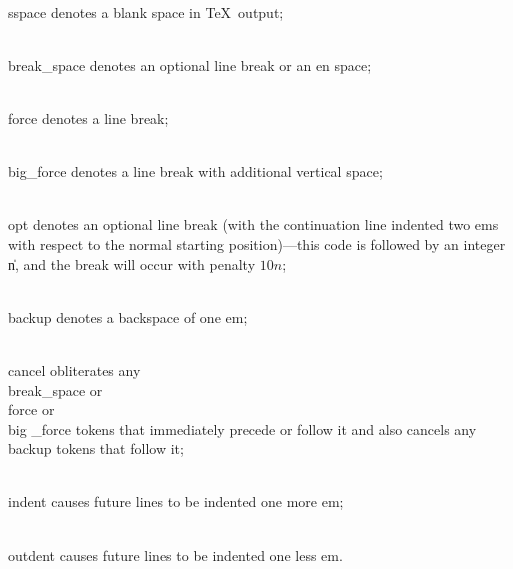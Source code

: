 \yskip\hang \\{sspace} denotes a blank space in \TeX\ output;

\yskip\hang \\{break\_space} denotes an optional line break or an en space;

\yskip\hang \\{force} denotes a line break;

\yskip\hang \\{big\_force} denotes a line break with additional vertical space;

\yskip\hang \\{opt} denotes an optional line break (with the continuation
line indented two ems with respect to the normal starting position)---this
code is followed by an integer \|n, and the break will occur with penalty
$10n$;

\yskip\hang \\{backup} denotes a backspace of one em;

\yskip\hang \\{cancel} obliterates any \\{break\_space} or \\{force} or \\{big%
\_force}
tokens that immediately precede or follow it and also cancels any
\\{backup} tokens that follow it;

\yskip\hang \\{indent} causes future lines to be indented one more em;

\yskip\hang \\{outdent} causes future lines to be indented one less em.

